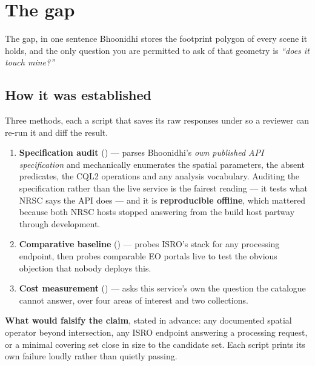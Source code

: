 \section{The gap}
\label{sec:gap}

\begin{keyfinding}{The gap, in one sentence}
Bhoonidhi stores the footprint polygon of every scene it holds, and the only
question you are permitted to ask of that geometry is \emph{``does it touch
mine?''}
\end{keyfinding}

\subsection{How it was established}
\label{sec:methodology}

Three methods, each a script that saves its raw responses under
 so a reviewer can re-run it and diff the result.

\begin{enumerate}[leftmargin=1.8em]
  \item \textbf{Specification audit} () --- parses
    Bhoonidhi's \emph{own published API specification} and mechanically
    enumerates the spatial parameters, the absent predicates, the CQL2
    operations and any analysis vocabulary. Auditing the specification rather
    than the live service is the fairest reading --- it tests what NRSC says
    the API does --- and it is \textbf{reproducible offline}, which mattered
    because both NRSC hosts stopped answering from the build host partway
    through development.
  \item \textbf{Comparative baseline} () --- probes
    ISRO's stack for any processing endpoint, then probes comparable EO
    portals live to test the obvious objection that nobody deploys this.
  \item \textbf{Cost measurement} () --- asks this
    service's own  the question the catalogue cannot
    answer, over four areas of interest and two collections.
\end{enumerate}

\textbf{What would falsify the claim}, stated in advance: any documented
spatial operator beyond intersection, any ISRO endpoint answering a processing
request, or a minimal covering set close in size to the candidate set. Each
script prints its own failure loudly rather than quietly passing.

